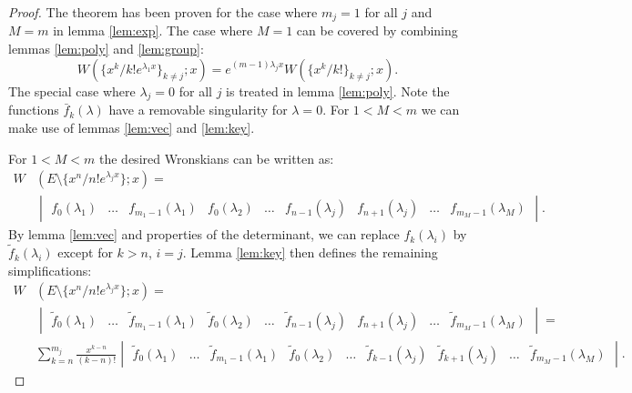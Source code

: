 \documentclass{book}
\begin{document}
\begin{proof}
The theorem has been proven for the case where $m_j = 1$ for all $j$ and $M = m$ in lemma \ref{lem:exp}.
The case where $M = 1$ can be covered by combining lemmas \ref{lem:poly} and \ref{lem:group}:
\begin{equation*}
W(\{ x^k/k! e^{\lambda_1 x} \}_{k\neq j} ; x) = e^{(m-1) \lambda_j x} W(\{x^k/k!\}_{k \neq j} ; x) .
\end{equation*}
The special case where $\lambda_j = 0$ for all $j$ is treated in lemma \ref{lem:poly}.
Note the functions $\bar{f}_k(\lambda)$ have a removable singularity for $\lambda=0$.
For $1 < M < m$ we can make use of lemmas \ref{lem:vec} and \ref{lem:key}.

For $1 < M < m$ the desired Wronskians can be written as:
\begin{align*}
W& (E \setminus \{ x^n/n! e^{\lambda_j x} \} ; x) = \\
& \begin{vmatrix} f_0(\lambda_1) & \dots & f_{m_1-1}(\lambda_1) & f_0(\lambda_2) & \dots
& f_{n-1}(\lambda_j) & f_{n+1}(\lambda_j) & \dots & f_{m_M-1}(\lambda_M) \end{vmatrix} .
\end{align*}
By lemma \ref{lem:vec} and properties of the determinant, we can replace $f_k(\lambda_i)$ by $\tilde{f}_k(\lambda_i)$ except for $k>n$, $i=j$.
Lemma \ref{lem:key} then defines the remaining simplifications:
\begin{align*}
W & (E \setminus \{ x^n/n! e^{\lambda_j x} \} ; x) = \\
& \begin{vmatrix} \tilde{f}_0(\lambda_1) & \dots & \tilde{f}_{m_1-1}(\lambda_1) & \tilde{f}_0(\lambda_2) & \dots
& \tilde{f}_{n-1}(\lambda_j) & f_{n+1}(\lambda_j) & \dots & \tilde{f}_{m_M-1}(\lambda_M) \end{vmatrix} = \\
& \sum_{k=n}^{m_j} \frac{x^{k-n}}{(k-n)!} \begin{vmatrix} \tilde{f}_0(\lambda_1) & \dots & \tilde{f}_{m_1-1}(\lambda_1) & \tilde{f}_0(\lambda_2) & \dots
& \tilde{f}_{k-1}(\lambda_j) & \tilde{f}_{k+1}(\lambda_j) & \dots & \tilde{f}_{m_M-1}(\lambda_M) \end{vmatrix} .
\end{align*}
\end{proof}
\end{document}
